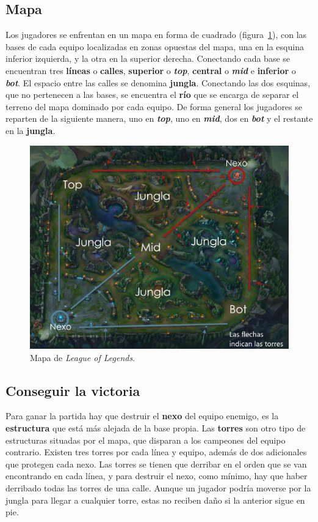 \subsection{Mapa}
Los jugadores se enfrentan en un mapa en forma de cuadrado (figura~\ref{fig:mapa-lol}), con las bases de cada equipo localizadas en zonas opuestas del mapa, una en la esquina inferior izquierda, y la otra en la superior derecha. Conectando cada base se encuentran tres \textbf{líneas} o \textbf{calles}, \textbf{superior} o \textit{\textbf{top}}, \textbf{central} o \textit{\textbf{mid}} e \textbf{inferior} o \textit{\textbf{bot}}. El espacio entre las calles se denomina \textbf{jungla}. Conectando las dos esquinas, que no pertenecen a las bases, se encuentra el \textbf{río} que se encarga de separar el terreno del mapa dominado por cada equipo. De forma general los jugadores se reparten de la siguiente manera, uno en \textit{\textbf{top}}, uno en \textit{\textbf{mid}}, dos en \textit{\textbf{bot}} y el restante en la \textbf{jungla}.

\begin{figure}
	\centering
	\includegraphics[width=1\linewidth]{img/mapa-lol}
	\caption{Mapa de \textit{League of Legends}.}
	\label{fig:mapa-lol}
\end{figure}

\subsection{Conseguir la victoria}
Para ganar la partida hay que destruir el \textbf{nexo} del equipo enemigo, es la \textbf{estructura} que está más alejada de la base propia. Las \textbf{torres} son otro tipo de estructuras situadas por el mapa, que disparan a los campeones del equipo contrario. Existen tres torres por cada línea y equipo, además de dos adicionales que protegen cada nexo. Las torres se tienen que derribar en el orden que se van encontrando en cada línea, y para destruir el nexo, como mínimo, hay que haber derribado todas las torres de una calle. Aunque un jugador podría moverse por la jungla para llegar a cualquier torre, estas no reciben daño si la anterior sigue en pie.

